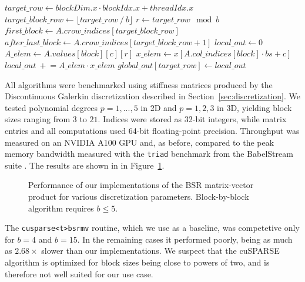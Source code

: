 \documentclass[11pt]{article}
\theoremstyle{definition}
\theoremstyle{theorem}
\begin{document}
\begin{algorithm}
  \caption{BSR matrix-vector product -- RPT-I kernel}
  \label{alg:bsr-mv-naive}
  $target\_row \gets blockDim.x \cdot blockIdx.x + threadIdx.x$\;
  $target\_block\_row \gets \lfloor target\_row\ /\ b\rfloor$\;
   { \Return }
  $r \gets target\_row\!\!\mod b$\;
  $first\_block \gets A.crow\_indices[target\_block\_row]$\;
  $after\_last\_block \gets A.crow\_indices[target\_block\_row + 1]$\;
  $local\_out \gets 0$\;
   {
     {
        $A\_elem \gets A.values[block][c][r]$\;
        $x\_elem \gets x[A.col\_indices[block] \cdot bs + c]$\;
        $local\_out\ +\!= A\_elem \cdot x\_elem$
    }
  }
  $global\_out[target\_row] \gets local\_out$
\end{algorithm}

All algorithms were benchmarked using stiffness matrices produced
by the Discontinuous Galerkin discretization described in Section~\ref{sec:discretization}.
We tested polynomial degrees $p=1,...,5$ in 2D and $p=1,2,3$ in 3D, yielding
block sizes ranging from $3$ to $21$. Indices were stored as 32-bit integers,
while matrix entries and all computations used 64-bit floating-point precision.
Throughput was measured on an NVIDIA A100 GPU and, as before, compared to the peak
memory bandwidth measured with
the \verb|triad| benchmark from the BabelStream suite \cite{babelstream}.
The results are shown in in Figure~\ref{fig:bsrmv_memory_throughput}.

\begin{figure}
  \centering
  
  \caption{Performance of our implementations of the BSR matrix-vector
  product for various discretization parameters. Block-by-block algorithm requires
  $b\leq 5$.}
  \label{fig:bsrmv_memory_throughput}
\end{figure}

The \texttt{cusparse<t>bsrmv} routine, which we use as a baseline, was competetive
only for $b=4$ and $b=15$. In the remaining cases it performed poorly, being as much as
$2.68\times$ slower than our implementations.
We suspect that the cuSPARSE algorithm is optimized for block sizes being
close to powers of two, and is therefore not well suited for our use case.
\end{document}
